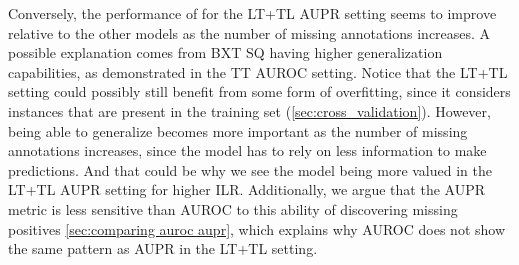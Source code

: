 Conversely, the performance of  for the LT+TL AUPR setting seems to improve relative to the other models as the number of missing annotations increases. A possible explanation comes from BXT SQ having higher generalization capabilities, as demonstrated in the TT AUROC setting. Notice that the LT+TL setting could possibly still benefit from some form of overfitting, since it considers instances that are present in the training set (\autoref{sec:cross_validation}). However, being able to generalize becomes more important as the number of missing annotations increases, since the model has to rely on less information to make predictions. And that could be why we see the  model being more valued in the LT+TL AUPR setting for higher ILR.
Additionally, we argue that the AUPR metric is less sensitive than AUROC to this ability of discovering missing positives \autoref{sec:comparing auroc aupr}, which explains why AUROC does not show the same pattern as AUPR in the LT+TL setting.






